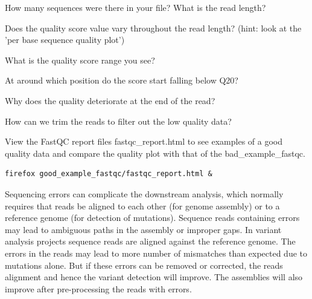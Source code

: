 \begin{questions}
How many sequences were there in your file? What is the read length?

\vspace{2cm}

Does the quality score value vary throughout the read length?
(hint: look at the 'per base sequence quality plot')

\vspace{2cm}

What is the quality score range you see?

\vspace{2cm}

At around which position do the score start falling below Q20? 

\vspace{2cm}

Why does the quality deteriorate at the end of the read?

\vspace{2cm}

How can we trim the reads to filter out the low quality data?

\vspace{2cm}

\end{questions}

\begin{bonus}
View the FastQC report files fastqc\_report.html to see examples of a good
quality data and compare the quality plot with that of the bad\_example\_fastqc.

\begin{lstlisting}
firefox good_example_fastqc/fastqc_report.html &
\end{lstlisting}
\end{bonus}

\begin{note}
Sequencing errors can complicate the downstream analysis, which normally
requires that reads be aligned to each other (for genome assembly) or to a
reference genome (for detection of mutations). Sequence reads containing errors
may lead to ambiguous paths in the assembly or improper gaps. In variant
analysis projects sequence reads are aligned against the reference genome. The
errors in the reads may lead to more number of mismatches than expected due to
mutations alone. But if these errors can be removed or corrected, the reads
alignment and hence the variant detection will improve. The assemblies will also
improve after pre-processing the reads with errors.
\end{note}

